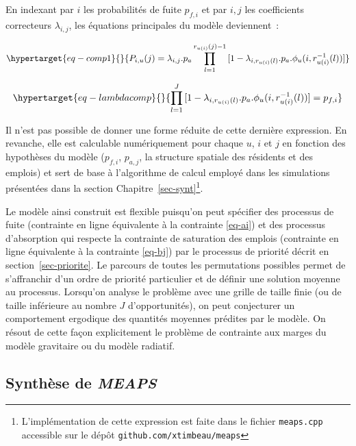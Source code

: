 \documentclass[
  10pt,
  a4paper,
  numbers=noendperiod,
  DIV=9]{scrreprt}
\begin{document}
En indexant par \(i\) les probabilités de fuite \(p_{f,i}\) et par
\(i,j\) les coefficients correcteurs \(\lambda_{i,j}\), les équations
principales du modèle deviennent~:

\begin{equation}\protect\hypertarget{eq-comp1}{}{
P_{i, u}(j) = \lambda_{i,j} . p_{a} \prod _{l=1} ^{r_{u(i)}(j)-1} {[1-\lambda_{i,r_{u(i)}(l)}. p_{a}.\phi_u(i,r_{u(i)}^{-1}(l))]}
}\label{eq-comp1}\end{equation}

\begin{equation}\protect\hypertarget{eq-lambdacomp}{}{
\prod _{l=1} ^{J} {[1-\lambda_{i,r_{u(i)}(l)}.p_{a}.\phi_u(i,r_{u(i)}^{-1}(l))]}= p_{f,i}
}\label{eq-lambdacomp}\end{equation}

Il n'est pas possible de donner une forme réduite de cette dernière
expression. En revanche, elle est calculable numériquement pour chaque
\(u\), \(i\) et \(j\) en fonction des hypothèses du modèle (\(p_{f,i}\),
\(p_{a,j}\), la structure spatiale des résidents et des emplois) et sert
de base à l'algorithme de calcul employé dans les simulations présentées
dans la section Chapitre~\ref{sec-synt}\footnote{L'implémentation de
  cette expression est faite dans le fichier \texttt{meaps.cpp}
  accessible sur le dépôt \texttt{github.com/xtimbeau/meaps}}.

Le modèle ainsi construit est flexible puisqu'on peut spécifier des
processus de fuite (contrainte en ligne équivalente à la contrainte
\ref{eq-ai}) et des processus d'absorption qui respecte la contrainte de
saturation des emplois (contrainte en ligne équivalente à la contrainte
\ref{eq-bj}) par le processus de priorité décrit en
section~\ref{sec-priorite}. Le parcours de toutes les permutations
possibles permet de s'affranchir d'un ordre de priorité particulier et
de définir une solution moyenne au processus. Lorsqu'on analyse le
problème avec une grille de taille finie (ou de taille inférieure au
nombre \(J\) d'opportunités), on peut conjecturer un comportement
ergodique des quantités moyennes prédites par le modèle. On résout de
cette façon explicitement le problème de contrainte aux marges du modèle
gravitaire ou du modèle radiatif.

\hypertarget{synthuxe8se-de-meaps}{%
\subsection{\texorpdfstring{Synthèse de
\emph{MEAPS}}{Synthèse de MEAPS}}\label{synthuxe8se-de-meaps}}
\end{document}

